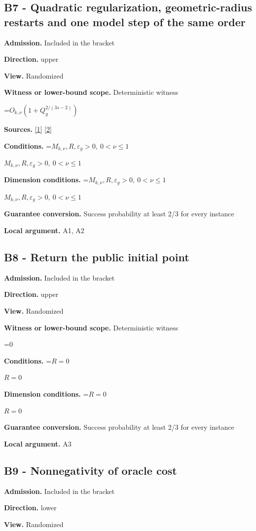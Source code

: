 \documentclass[10pt,a4paper]{article}
\newcommand{\AtlasMath}[1]{\par\begingroup\centering\setbox0=\hbox{$\displaystyle #1$}\ifdim\wd0>1.4\linewidth\typeout{ATLAS WIDE FORMULA: \the\wd0}\fi\ifdim\wd0>\linewidth\resizebox{\linewidth}{!}{\box0}\else\box0\fi\par\endgroup}
\newcommand{\AtlasInlineMath}[1]{\begingroup\setbox0=\hbox{$#1$}\ifdim\wd0>.4\linewidth\endgroup\AtlasMath{#1}\else\endgroup$#1$\fi}
\begin{document}
\subsection{B7 - Quadratic regularization, geometric-radius restarts and one model step of the same order}
\textbf{Admission.} Included in the bracket

\textbf{Direction.} upper

\textbf{View.} Randomized

\textbf{Witness or lower-bound scope.} Deterministic witness

\AtlasMath{O_{k,\nu}(1+Q_g^{2/(3s-2)})}
\textbf{Sources.} \href{https://arxiv.org/pdf/2411.08987v2}{[1]} \href{https://arxiv.org/pdf/2205.09647v1}{[2]}

\textbf{Conditions.} \AtlasInlineMath{M_{k,\nu},R,\varepsilon_g>0,\ 0<\nu\le1}

\textbf{Dimension conditions.} \AtlasInlineMath{M_{k,\nu},R,\varepsilon_g>0,\ 0<\nu\le1}

\textbf{Guarantee conversion.} Success probability at least 2/3 for every instance

\textbf{Local argument.} A1, A2

\subsection{B8 - Return the public initial point}
\textbf{Admission.} Included in the bracket

\textbf{Direction.} upper

\textbf{View.} Randomized

\textbf{Witness or lower-bound scope.} Deterministic witness

\AtlasMath{0}
\textbf{Conditions.} \AtlasInlineMath{R=0}

\textbf{Dimension conditions.} \AtlasInlineMath{R=0}

\textbf{Guarantee conversion.} Success probability at least 2/3 for every instance

\textbf{Local argument.} A3

\subsection{B9 - Nonnegativity of oracle cost}
\textbf{Admission.} Included in the bracket

\textbf{Direction.} lower

\textbf{View.} Randomized
\end{document}
